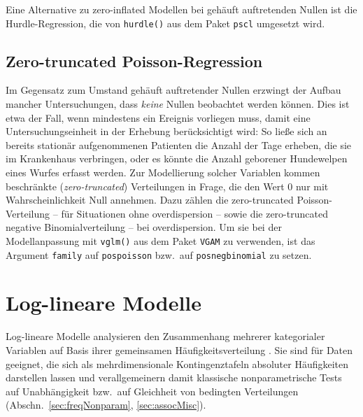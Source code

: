 Eine Alternative zu zero-inflated Modellen bei gehäuft auftretenden Nullen ist die Hurdle-Regression, die von \lstinline!hurdle()! aus dem Paket \lstinline!pscl! umgesetzt wird.

\subsection{Zero-truncated Poisson-Regression}

Im Gegensatz zum Umstand gehäuft auftretender Nullen erzwingt der Aufbau mancher Untersuchungen, dass \emph{keine} Nullen beobachtet werden können. Dies ist etwa der Fall, wenn mindestens ein Ereignis vorliegen muss, damit eine Untersuchungseinheit in der Erhebung berücksichtigt wird: So ließe sich an bereits stationär aufgenommenen Patienten die Anzahl der Tage erheben, die sie im Krankenhaus verbringen, oder es könnte die Anzahl geborener Hundewelpen eines Wurfes erfasst werden. Zur Modellierung solcher Variablen kommen beschränkte (\emph{zero-truncated}) Verteilungen in Frage, die den Wert $0$ nur mit Wahrscheinlichkeit Null annehmen. Dazu zählen die zero-truncated Poisson-Verteilung -- für Situationen ohne overdispersion -- sowie die zero-truncated negative Binomialverteilung -- bei overdispersion. Um sie bei der Modellanpassung mit \lstinline!vglm()! aus dem Paket \lstinline!VGAM! zu verwenden, ist das Argument \lstinline!family! auf \lstinline!pospoisson! bzw.\ auf \lstinline!posnegbinomial! zu setzen.

\section{Log-lineare Modelle}
\label{sec:loglin}

Log-lineare Modelle analysieren den Zusammenhang mehrerer kategorialer Variablen auf Basis ihrer gemeinsamen Häufigkeitsverteilung \cite{Agresti2007}. Sie sind für Daten geeignet, die sich als mehrdimensionale Kontingenztafeln absoluter Häufigkeiten darstellen lassen und verallgemeinern damit klassische nonparametrische Tests auf Unabhängigkeit bzw.\ auf Gleichheit von bedingten Verteilungen (Abschn.\ \ref{sec:freqNonparam}, \ref{sec:assocMisc}).

